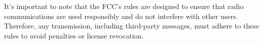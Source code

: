 It's important to note that the FCC's rules are designed to ensure that radio communications are used responsibly and do not interfere with other users. Therefore, any transmission, including third-party messages, must adhere to these rules to avoid penalties or license revocation.

